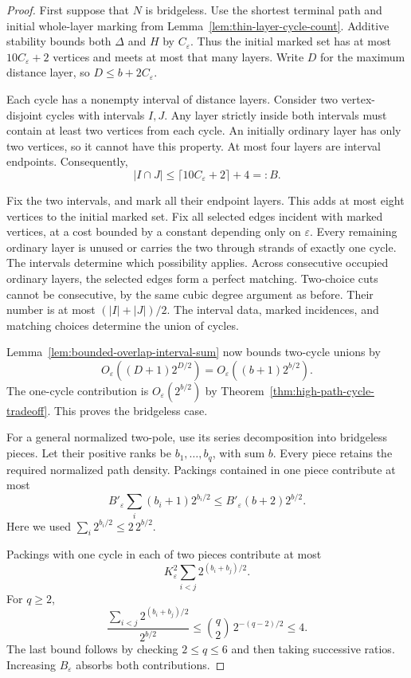 \begin{proof}
First suppose that $N$ is bridgeless.
Use the shortest terminal path and initial whole-layer marking from Lemma~\ref{lem:thin-layer-cycle-count}.
Additive stability bounds both $\Delta$ and $H$ by $C_\varepsilon$.
Thus the initial marked set has at most $10C_\varepsilon+2$ vertices and meets at most that many layers.
Write $D$ for the maximum distance layer, so $D\le b+2C_\varepsilon$.

Each cycle has a nonempty interval of distance layers.
Consider two vertex-disjoint cycles with intervals $I,J$.
Any layer strictly inside both intervals must contain at least two vertices from each cycle.
An initially ordinary layer has only two vertices, so it cannot have this property.
At most four layers are interval endpoints.
Consequently,
\[
 |I\cap J|\le \lceil10C_\varepsilon+2\rceil+4=:B.
\]

Fix the two intervals, and mark all their endpoint layers.
This adds at most eight vertices to the initial marked set.
Fix all selected edges incident with marked vertices, at a cost bounded by a constant depending only on $\varepsilon$.
Every remaining ordinary layer is unused or carries the two through strands of exactly one cycle.
The intervals determine which possibility applies.
Across consecutive occupied ordinary layers, the selected edges form a perfect matching.
Two-choice cuts cannot be consecutive, by the same cubic degree argument as before.
Their number is at most $(|I|+|J|)/2$.
The interval data, marked incidences, and matching choices determine the union of cycles.

Lemma~\ref{lem:bounded-overlap-interval-sum} now bounds two-cycle unions by
\[
 O_\varepsilon((D+1)2^{D/2})
 =O_\varepsilon((b+1)2^{b/2}).
\]
The one-cycle contribution is $O_\varepsilon(2^{b/2})$ by Theorem~\ref{thm:high-path-cycle-tradeoff}.
This proves the bridgeless case.

For a general normalized two-pole, use its series decomposition into bridgeless pieces.
Let their positive ranks be $b_1,\ldots,b_q$, with sum $b$.
Every piece retains the required normalized path density.
Packings contained in one piece contribute at most
\[
 B'_\varepsilon\sum_i(b_i+1)2^{b_i/2}
 \le B'_\varepsilon(b+2)2^{b/2}.
\]
Here we used $\sum_i2^{b_i/2}\le2\,2^{b/2}$.

Packings with one cycle in each of two pieces contribute at most
\[
 K_\varepsilon^2\sum_{i<j}2^{(b_i+b_j)/2}.
\]
For $q\ge2$,
\[
 \frac{\sum_{i<j}2^{(b_i+b_j)/2}}{2^{b/2}}
 \le\binom q2\,2^{-(q-2)/2}\le4.
\]
The last bound follows by checking $2\le q\le6$ and then taking successive ratios.
Increasing $B_\varepsilon$ absorbs both contributions.
\end{proof}

